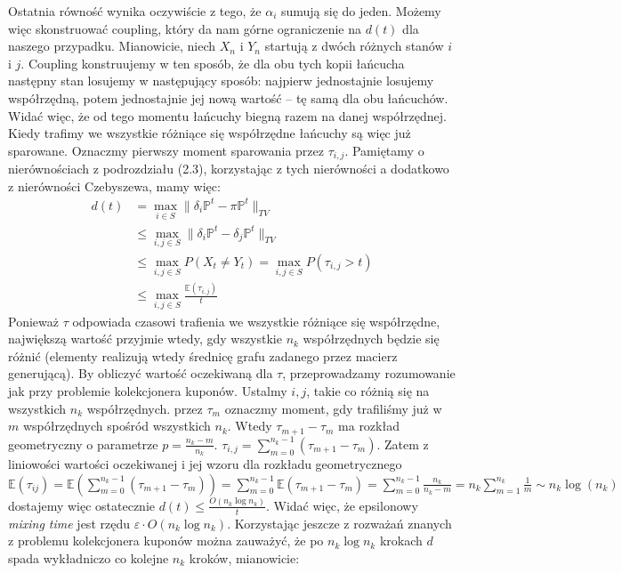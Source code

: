 \documentclass[a4paper]{article}
\begin{document}
Ostatnia równość wynika oczywiście z tego, że $\alpha_i$ sumują się do jeden. Możemy więc skonstruować coupling, który da nam górne ograniczenie na $d(t)$ dla naszego przypadku. Mianowicie, niech $X_n$ i $Y_n$ startują z dwóch różnych stanów $i$ i $j$. Coupling konstruujemy w ten sposób, że dla obu tych kopii łańcucha następny stan losujemy w następujący sposób: najpierw jednostajnie losujemy współrzędną, potem jednostajnie jej nową wartość – tę samą dla obu łańcuchów. Widać więc, że od tego momentu łańcuchy biegną razem na danej współrzędnej. Kiedy trafimy we wszystkie różniące się współrzędne łańcuchy są więc już sparowane. Oznaczmy pierwszy moment sparowania przez $\tau_{i,j}$. Pamiętamy o nierównościach z podrozdziału (2.3), korzystając z tych nierówności a dodatkowo z nierówności Czebyszewa, mamy więc:
\begin{align*}
    d(t) &= \max_{i \in S} \|\delta_i \mathbb{P}^t - \pi \mathbb{P}^t\|_{TV} \\
    &\leq \max_{i,j \in S} \|\delta_i \mathbb{P}^t - \delta_j \mathbb{P}^t \|_{TV} \\
    &\leq \max_{i,j \in S} P(X_t \neq Y_t) =  \max_{i,j \in S} P(\tau_{i,j} > t) \\
    &\leq \max_{i,j \in S}\frac{\mathbb{E}(\tau_{i,j})}{t}
\end{align*}
Ponieważ $\tau$ odpowiada czasowi trafienia we wszystkie różniące się współrzędne, największą wartość przyjmie wtedy, gdy wszystkie $n_k$ współrzędnych będzie się różnić (elementy realizują wtedy średnicę grafu zadanego przez macierz generującą). By obliczyć wartość oczekiwaną dla $\tau$, przeprowadzamy rozumowanie jak przy problemie kolekcjonera kuponów. Ustalmy $i,j$, takie co różnią się na wszystkich $n_k$ współrzędnych. przez $\tau_m$ oznaczmy moment, gdy trafiliśmy już w $m$ współrzędnych spośród wszystkich $n_k$. Wtedy $\tau_{m+1} - \tau_m$ ma rozkład geometryczny o parametrze $p = \frac{n_k - m}{n_k}$. $\tau_{i,j} = \sum\limits_{m=0}^{n_k - 1} (\tau_{m+1} - \tau_m)$. Zatem z liniowości wartości oczekiwanej i jej wzoru dla rozkładu geometrycznego\\
$\mathbb{E}(\tau_{ij}) = \mathbb{E}(\sum\limits_{m=0}^{n_k - 1} (\tau_{m+1} - \tau_m)) = \sum\limits_{m=0}^{n_k - 1} \mathbb{E}(\tau_{m+1} - \tau_m) = \sum\limits_{m=0}^{n_k - 1} \frac{n_k}{n_k - m} = n_k \sum\limits_{m=1}^{n_k} \frac{1}{m} \sim n_k \log(n_k)$\\
dostajemy więc ostatecznie $d(t) \leq \frac{O(n_k \log n_k)}{t}$. Widać więc, że epsilonowy \textit{mixing time} jest rzędu $\varepsilon \cdot O(n_k \log n_k)$. Korzystając jeszcze z rozważań znanych z problemu kolekcjonera kuponów można zauważyć, że po $n_k \log n_k$ krokach $d$ spada wykładniczo co kolejne $n_k$ kroków, mianowicie:
\end{document}
